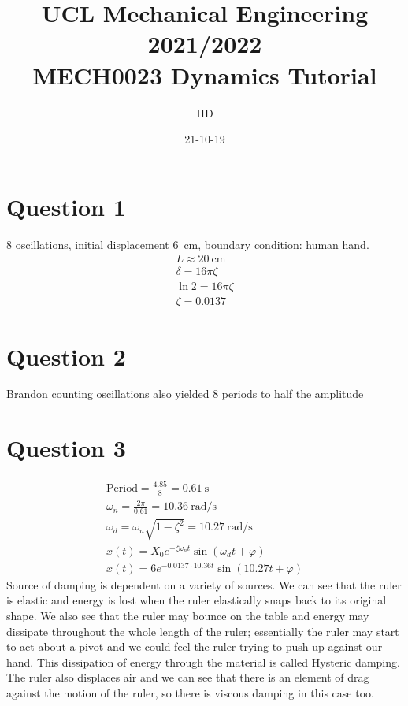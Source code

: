 \documentclass[11pt]{article}
\begin{document}
\title{\textbf{UCL Mechanical Engineering 2021/2022}\\MECH0023 Dynamics Tutorial}
\author{HD}
\date{21-10-19}
\maketitle
\section*{Question 1}
8 oscillations, initial displacement \SI{6}{\centi\meter}, boundary condition: human hand.
\begin{gather}
    L \approx \SI{20}{\centi\meter}\\
    \delta = 16\pi \zeta\\
    \ln 2 = 16\pi\zeta\\
    \zeta = 0.0137
\end{gather}
\section*{Question 2}
Brandon counting oscillations also yielded 8 periods to half the amplitude
\section*{Question 3}
\begin{gather}
    \textrm{Period} = \frac{4.85}{8} = \SI{0.61}{\second}\\
    \omega_n = \frac{2\pi}{0.61} = \SI{10.36}{\radian \per \second}\\
    \omega_d = \omega_n \sqrt{1-\zeta^2} = \SI{10.27}{\radian \per \second}\\
    x(t) = X_0 e^{-\zeta \omega_n t}\sin\left(\omega_d t + \varphi\right)\\
    x(t) = 6 e^{-0.0137 \cdot 10.36 t}\sin\left(10.27 t + \varphi\right)
\end{gather}
Source of damping is dependent on a variety of sources. We can see that the ruler is elastic and energy is lost when the ruler elastically snaps back to its original shape. We also see that the ruler may bounce on the table and energy may dissipate throughout the whole length of the ruler; essentially the ruler may start to act about a pivot and we could feel the ruler trying to push up against our hand. This dissipation of energy through the material is called Hysteric damping. The ruler also displaces air and we can see that there is an element of drag against the motion of the ruler, so there is viscous damping in this case too.
\end{document}
